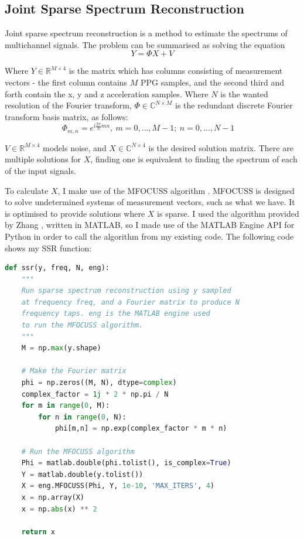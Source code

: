 \documentclass[12pt,a4paper,twoside,openany]{report}
\begin{document}
\subsection{Joint Sparse Spectrum Reconstruction}

Joint sparse spectrum reconstruction is a method to estimate the spectrums of
multichannel signals. The problem can be summarised as solving the equation 
$$ Y = \Phi X + V $$

Where $Y \in \mathbb{R}^{M \times 4}$ is the matrix which has columns consisting of measurement vectors -
the first column contains $M$ PPG samples, and the second third and forth contain
the x, y and z acceleration samples. Where $N$ is the wanted resolution of
the Fourier transform, $\Phi \in \mathbb{C}^{N \times M}$ is the redundant discrete Fourier
transform basis matrix, as follows:
$$ \Phi_{m,n} = e^{i \frac{2 \pi}{N}mn},\ m = 0,\ldots,M-1;\ n=0,\ldots,N-1
\quad $$

$V \in \mathbb{R} ^{M \times 4}$ models noise, and $X \in
\mathbb{C}^{N \times 4}$ is the desired solution matrix. There are multiple
solutions for $X$, finding one is equivalent to finding the spectrum of each
of the input signals.

To calculate $X$, I make use of the MFOCUSS algorithm \cite{Cotter05}.
MFOCUSS is designed to solve undetermined systems of measurement vectors, such
as what we have. It is optimised to provide solutions where $X$ is sparse.
I used the
algorithm provided by Zhang \cite{ZhangCodes}, written in MATLAB, so I made use of the MATLAB
Engine API for Python in order to call the algorithm from my existing code. The 
following code shows my SSR function:

\begin{lstlisting}[language=Python]
def ssr(y, freq, N, eng):
    """
    Run sparse spectrum reconstruction using y sampled 
    at frequency freq, and a Fourier matrix to produce N 
    frequency taps. eng is the MATLAB engine used
    to run the MFOCUSS algorithm.
    """
    M = np.max(y.shape)

    # Make the Fourier matrix
    phi = np.zeros((M, N), dtype=complex)
    complex_factor = 1j * 2 * np.pi / N 
    for m in range(0, M): 
        for n in range(0, N): 
            phi[m,n] = np.exp(complex_factor * m * n)

    # Run the MFOCUSS algorithm
    Phi = matlab.double(phi.tolist(), is_complex=True)
    Y = matlab.double(y.tolist())
    X = eng.MFOCUSS(Phi, Y, 1e-10, 'MAX_ITERS', 4)
    x = np.array(X)
    x = np.abs(x) ** 2

    return x
\end{lstlisting}
\end{document}
